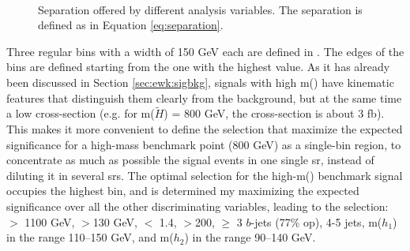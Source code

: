 \begin{figure}[htpb]
\begin{center}
\\
\caption{Separation offered by different analysis variables. The separation is defined as in Equation \ref{eq:separation}.}
\label{fig:ewk:separation}
\end{center}
\end{figure}

Three regular bins with a width of 150 GeV each are defined in \meffb. 
The edges of the bins are defined starting from the one with the highest value. 
As it has already been discussed in Section \ref{sec:ewk:sigbkg},
signals with high m(\hino) have kinematic features that distinguish them clearly from the background, 
but at the same time a low cross-section (e.g. for m($\tilde{H}$) = 800 GeV, the cross-section is about 3 fb). 
This makes it more convenient to define the selection that maximize the expected significance for a high-mass benchmark point (800 GeV) 
as a single-bin region, to concentrate as much as possible the signal events in one single \gls{sr}, 
instead of diluting it in several \glspl{sr}. %
The optimal selection for the high-m(\hino) benchmark signal occupies the highest \meffb bin,
and is determined my maximizing the expected significance over all the other discriminating variables,
leading to the selection:
\meffb $>$ 1100 GeV, \mtb$>$130 GeV, \dRmax $<$ 1.4, \met $>$200, $\geq$ 3 $b$-jets (77\% \gls{op}), 
4-5 jets, m($h_1$) in the range 110--150 GeV, and m($h_2$) in the range 90--140 GeV.

